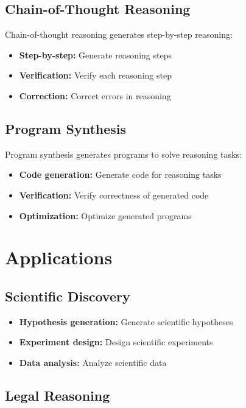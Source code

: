 \subsection{Chain-of-Thought Reasoning}

Chain-of-thought reasoning generates step-by-step reasoning:
\begin{itemize}
    \item \textbf{Step-by-step:} Generate reasoning steps
    \item \textbf{Verification:} Verify each reasoning step
    \item \textbf{Correction:} Correct errors in reasoning
\end{itemize}

\subsection{Program Synthesis}

Program synthesis generates programs to solve reasoning tasks:
\begin{itemize}
    \item \textbf{Code generation:} Generate code for reasoning tasks
    \item \textbf{Verification:} Verify correctness of generated code
    \item \textbf{Optimization:} Optimize generated programs
\end{itemize}

\section{Applications}

\subsection{Scientific Discovery}

\begin{itemize}
    \item \textbf{Hypothesis generation:} Generate scientific hypotheses
    \item \textbf{Experiment design:} Design scientific experiments
    \item \textbf{Data analysis:} Analyze scientific data
\end{itemize}

\subsection{Legal Reasoning}

